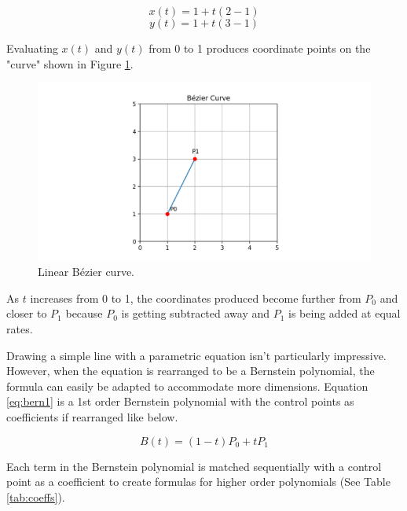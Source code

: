 \documentclass[12pt,letterpaper]{article}
\begin{document}
$$x(t) = 1 + t(2-1)$$
$$y(t) = 1 + t(3-1)$$

Evaluating $x(t)$ and $y(t)$ from 0 to 1 produces coordinate points on the "curve" shown in Figure \ref{fig:bez2}. 

\begin{figure}[H]
    \includegraphics[width=15cm]{Figure_3}
    \centering
    \caption{Linear B\'ezier curve.}
    \label{fig:bez2}
\end{figure}

As $t$ increases from 0 to 1, the coordinates produced become further from $P_0$ and closer to $P_1$ because $P_0$ is getting subtracted away and $P_1$ is being added at equal rates. 

Drawing a simple line with a parametric equation isn’t particularly impressive. However, when the equation is rearranged to be a Bernstein polynomial, the formula can easily be adapted to accommodate more dimensions. Equation \ref{eq:bern1} is a 1st order Bernstein polynomial with the control points as coefficients if rearranged like below.

\begin{equation}
    \label{eq:bern1}
    B(t) = (1-t)P_0 + t P_1
\end{equation}

Each term in the Bernstein polynomial is matched sequentially with a control point as a coefficient to create formulas for higher order polynomials (See Table \ref{tab:coeffs}).
\end{document}
